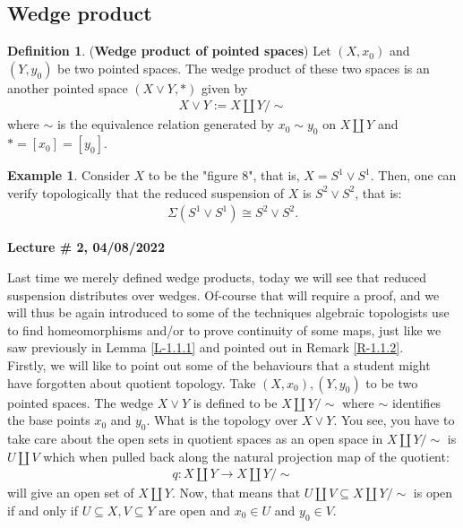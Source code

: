 \documentclass[letterpaper,11pt,twoside]{article}
\theoremstyle{definition}
\theoremstyle{definition}
\newtheorem{definition}[proposition]{Definition}
\theoremstyle{definition}
\theoremstyle{definition}
\theoremstyle{definition}
\newtheorem*{example}{\textbf{Example}}
\theoremstyle{definition}
\theoremstyle{remark}
\theoremstyle{definition}
\newcommand{\isom}{\cong}
\newcommand{\newlecture}[2]{\begin{center}
    \textbf{Lecture \# #1, #2}
\end{center}}
\newcommand{\rsusp}[1]{\Sigma\left(#1\right)}
\begin{document}
	\subsection{Wedge product}
	\begin{definition}
	    (\textbf{Wedge product of pointed spaces}) Let $(X,x_0)$ and $(Y,y_0)$ be two pointed spaces. The wedge product of these two spaces is an another pointed space $(X\vee Y, *)$ given by
	    \begin{align*}
	        X\vee Y := X\amalg Y/\sim
	    \end{align*}
	    where $\sim$ is the equivalence relation generated by $x_0 \sim y_0$ on $X\amalg Y$ and $* = [x_0] = [y_0]$.
	\end{definition}
	\begin{example}
	Consider $X$ to be the "figure 8", that is, $X = S^1 \vee S^1$. Then, one can verify topologically that the reduced suspension of $X$ is $S^2 \vee S^2$, that is:
	\begin{align*}
	    \rsusp{S^1\vee S^1} \isom S^2 \vee S^2.
	\end{align*}
	\end{example}
	\newlecture{2}{04/08/2022}
	Last time we merely defined wedge products, today we will see that reduced suspension distributes over wedges. Of-course that will require a proof, and we will thus be again introduced to some of the techniques algebraic topologists use to find homeomorphisms and/or to prove continuity of some maps, just like we saw previously in Lemma \ref{L-1.1.1} and pointed out in Remark \ref{R-1.1.2}.\\
	
	Firstly, we will like to point out some of the behaviours that a student might have forgotten about quotient topology. Take $(X,x_0), (Y,y_0)$ to be two pointed spaces. The wedge $X \vee Y$ is defined to be $X\amalg Y/\sim$ where $\sim$ identifies the base points $x_0$ and $y_0$. What is the topology over $X\vee Y$. You see, you have to take care about the open sets in quotient spaces as an open space in $X\amalg Y/\sim$ is $U\amalg V$ which when pulled back along the natural projection map of the quotient:
	\begin{align*}
	    q : X\amalg Y \longrightarrow X\amalg Y/\sim
	\end{align*}
	will give an open set of $X\amalg Y$. Now, that means that $U\amalg V \subseteq X\amalg Y/\sim$ is open if and only if $U\subseteq X, V\subseteq Y$ are open and $x_0 \in U$ and $y_0 \in V$.\\
	
\end{document}
